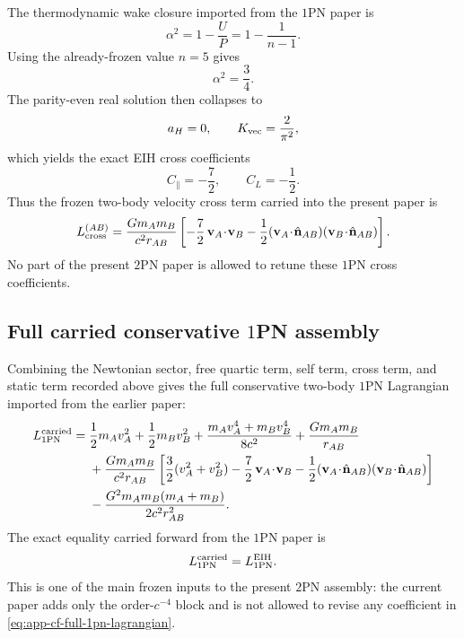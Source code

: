 \documentclass[11pt]{article}
\newcommand{\OnePN}{\mathrm{1PN}}
\newcommand{\TwoPN}{\mathrm{2PN}}
\begin{document}
The thermodynamic wake closure imported from the \(\OnePN\) paper is
\begin{equation}
\alpha^2
=
1-\frac{U}{P}
=
1-\frac{1}{n-1}.
\label{eq:app-cf-alpha-thermo}
\end{equation}
Using the already-frozen value \(n=5\) gives
\begin{equation}
\alpha^2=\frac34.
\label{eq:app-cf-alpha-value}
\end{equation}
The parity-even real solution then collapses to
\begin{equation}
a_H=0,
\qquad
K_{\rm vec}=\frac{2}{\pi^2},
\label{eq:app-cf-ah-kvec}
\end{equation}
which yields the exact EIH cross coefficients
\begin{equation}
C_\parallel=-\frac72,
\qquad
C_L=-\frac12.
\label{eq:app-cf-Cpar-CL}
\end{equation}
Thus the frozen two-body velocity cross term carried into the present paper is
\begin{equation}
L_{\rm cross}^{(AB)}
=
\frac{Gm_A m_B}{c^2r_{AB}}
\left[
-\frac72\,\mathbf v_A\!\cdot\!\mathbf v_B
-\frac12(\mathbf v_A\!\cdot\!\hat{\mathbf n}_{AB})(\mathbf v_B\!\cdot\!\hat{\mathbf n}_{AB})
\right].
\label{eq:app-cf-cross-two-body}
\end{equation}
No part of the present \(\TwoPN\) paper is allowed to retune these \(\OnePN\) cross
coefficients.

\subsection{Full carried conservative \texorpdfstring{$1$}{1}PN assembly}
\label{app:carry-forward-full-1pn}

Combining the Newtonian sector, free quartic term, self term, cross term, and static term
recorded above gives the full conservative two-body \(\OnePN\) Lagrangian imported from
the earlier paper:
\begin{align}
L_{\OnePN}^{\rm carried}
={}&
\frac12m_Av_A^2+\frac12m_Bv_B^2
+\frac{m_Av_A^4+m_Bv_B^4}{8c^2}
+\frac{Gm_A m_B}{r_{AB}}
\nonumber\\
&+\frac{Gm_A m_B}{c^2r_{AB}}
\left[
\frac32(v_A^2+v_B^2)
-\frac72\,\mathbf v_A\!\cdot\!\mathbf v_B
-\frac12(\mathbf v_A\!\cdot\!\hat{\mathbf n}_{AB})(\mathbf v_B\!\cdot\!\hat{\mathbf n}_{AB})
\right]
\nonumber\\
&-\frac{G^2m_A m_B(m_A+m_B)}{2c^2r_{AB}^2}.
\label{eq:app-cf-full-1pn-lagrangian}
\end{align}
The exact equality carried forward from the \(\OnePN\) paper is
\begin{equation}
L_{\OnePN}^{\rm carried}=L_{\OnePN}^{\rm EIH}.
\label{eq:app-cf-exact-eih}
\end{equation}
This is one of the main frozen inputs to the present \(\TwoPN\) assembly: the current
paper adds only the order-\(c^{-4}\) block and is not allowed to revise any coefficient
in \cref{eq:app-cf-full-1pn-lagrangian}.
\end{document}
